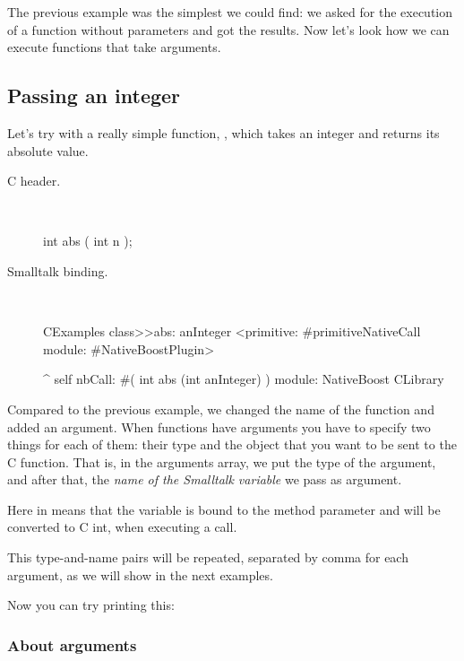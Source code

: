\documentclass[a4paper,10pt,twoside]{book}
\begin{document}
The previous example was the simplest we could find: we asked for the execution of a function without parameters and got the results. Now let's look how we can execute functions that take arguments. 

\subsection{Passing an integer}

Let's try with a really simple function, , which takes
an integer and returns its absolute value.

\begin{description}
\item [C header.] \ 

\begin{code}{}
int abs ( int n );
\end{code}

\item [Smalltalk binding.] \ 

\begin{code}{}
CExamples class>>abs: anInteger
	<primitive: #primitiveNativeCall module: #NativeBoostPlugin>
	
	^ self nbCall: #( int abs (int anInteger) ) module: NativeBoost CLibrary
\end{code}

\end{description}


Compared to the previous example, we changed the name of the function and added an argument. 
When functions have arguments you have to specify two things for each of them:
their type and the object that you want to be sent to the C function. That is, in the arguments array, we put the type
of the argument, and after that, the \emph{name of the Smalltalk variable} we pass as argument. 

Here  in  means that the variable is bound to the  method parameter and will be converted to C int,
when executing a call. 

This type-and-name pairs will be repeated, separated by comma for each argument,
as we will show in the next examples. 


Now you can try printing this:


\subsubsection{About arguments}
\end{document}
